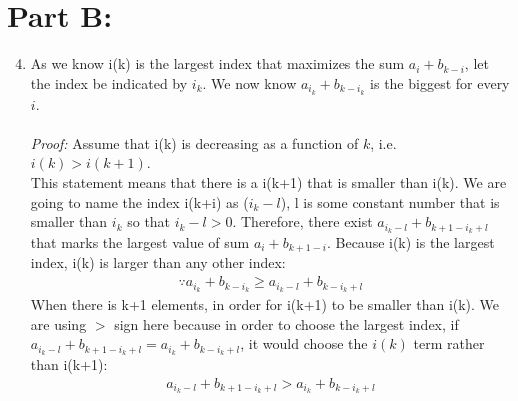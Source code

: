 \documentclass{article}
\begin{document}
\section{Part B:}
\begin{enumerate}
\setcounter{enumi}{3}
\item As we know i(k) is the largest index that maximizes the sum $a_i + b_{k-i}$, let the index
be indicated by $i_k$. We now know $a_{i_k} + b_{k-i_k}$ is the biggest for every $i$. \\
\\\textit{Proof:} Assume that i(k) is decreasing as a function of $k$, i.e. $i(k) > i(k+1)$.\\
This statement means that there is a i(k+1) that is smaller than i(k). We are going to name the 
index i(k+i) as ($i_k-l$), l is some constant number that is smaller than $i_k$ 
so that $i_k-l > 0$. Therefore, there exist $a_{i_k-l} + b_{k+1-i_k+l}$ that marks the 
largest value of sum $a_i + b_{k+1-i}$. 
Because i(k) is the largest index, i(k) is larger than any other index:
\begin{align}
    \because a_{i_k} + b_{k-i_k} \geq a_{i_k-l} + b_{k-i_k+l}
\end{align}
When there is k+1 elements, in order for i(k+1) to be smaller than i(k). We are using
$>$ sign here because in order to choose the largest index, if $a_{i_k-l} + b_{k+1-i_k+l}
 = a_{i_k} + b_{k-i_k+l}$, it would choose the $i(k)$ term rather than i(k+1):
\begin{align}
    a_{i_k-l} + b_{k+1-i_k+l} > a_{i_k} + b_{k-i_k+l}
\end{align}


\end{enumerate}
\end{document}
